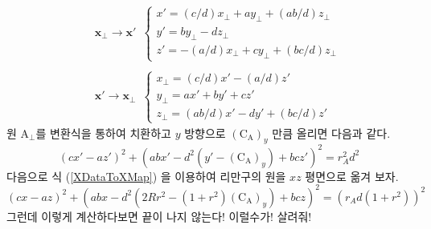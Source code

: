 \documentclass[chapter,a4paper,10pt]{oblivoir}
\begin{document}
\begin{eqnarray}
&&\mathbf{x}_\perp\rightarrow\mathbf{x}'\,\,\,
\left\{ \begin{array}{ll}
x' = ({c}/{d})x_\perp + ay_\perp + ({ab}/{d})z_\perp\\
y' = by_\perp - dz_\perp\\
z' = -({a}/{d})x_\perp + cy_\perp + ({bc}/{d})z_\perp
\end{array} \right.\\
\nonumber\\
&&\mathbf{x}'\rightarrow\mathbf{x}_\perp\,\,\,
\left\{ \begin{array}{ll}
x_\perp = ({c}/{d})x' - ({a}/{d})z'\\
y_\perp = ax' + by' + cz'\\
z_\perp = ({ab}/{d})x' - dy' + ({bc}/{d})z'
\end{array} \right.
\end{eqnarray}
원 $\textrm{A}_\perp$를 변환식을 통하여 치환하고 
$y$ 방향으로 $(\textrm{C}_\textrm{A})_y$ 만큼 올리면 다음과 같다.
\begin{equation}
\left(cx' - az'\right)^2 + \left(abx' - d^2(y'-(\textrm{C}_\textrm{A})_y) + bcz'\right)^2 = r_A^2d^2
\end{equation}
다음으로 식 (\ref{XDataToXMap}) 을 이용하여 리만구의 원을 $xz$ 평면으로 옮겨 보자.
\begin{equation}
\left(cx - az\right)^2 + \left(abx - d^2\left(2Rr^2-(1+r^2)(\textrm{C}_\textrm{A})_y\right) + bcz\right)^2 = \left(r_Ad(1+r^2)\right)^2
\end{equation}
그런데 이렇게 계산하다보면 끝이 나지 않는다! 이럴수가! 살려줘! 
\end{document}
